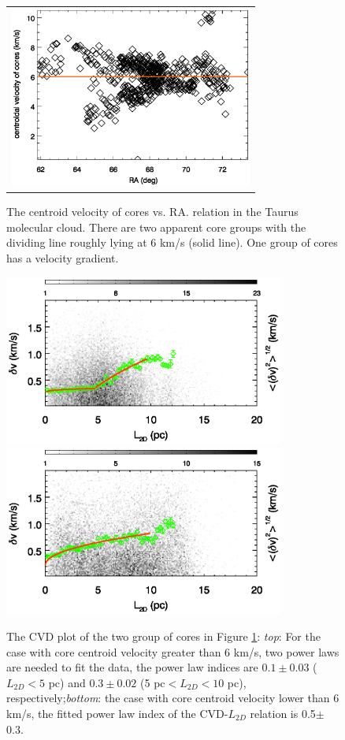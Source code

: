 \documentclass[iop,revtex4]{emulateapj}
\begin{document}
\begin{figure}[htbp]
\centering
\begin{tabular}{c}
\includegraphics[width=8cm]{tau_velocityra.eps}\\
\end{tabular}
\caption{The centroid velocity of cores vs. RA. relation in the Taurus molecular cloud. There are two apparent core groups with the
dividing line roughly lying at 6 km/s (solid line). One group of cores has a velocity gradient. \label{fig:taurus_core_gradient}}
\end{figure}

\begin{figure}[htbp]
\begin{minipage}[b]{0.45\textwidth}
  \includegraphics[width=9.2cm]{tau_vdis_all_gt6.eps}\\
  \includegraphics[width=9.2cm]{tau_vdis_all_lt6.eps}
\end{minipage}
\caption{The CVD plot of the two group of cores in Figure \ref{fig:taurus_core_gradient}: {\it top}: For the case with core centroid velocity greater than 6 km/s, two power laws are needed to fit the data, the power law indices are $0.1\pm 0.03$ ($L_{2D}<5$ pc) and $0.3\pm 0.02$ (5 pc$<L_{2D}<10$ pc), respectively;{\it bottom}: the case with core centroid velocity lower than 6 km/s, the fitted power law index of the CVD-$L_{2D}$ relation is 0.5$\pm$0.3.}\label{fig:taurus_group}
\end{figure}
\end{document}
